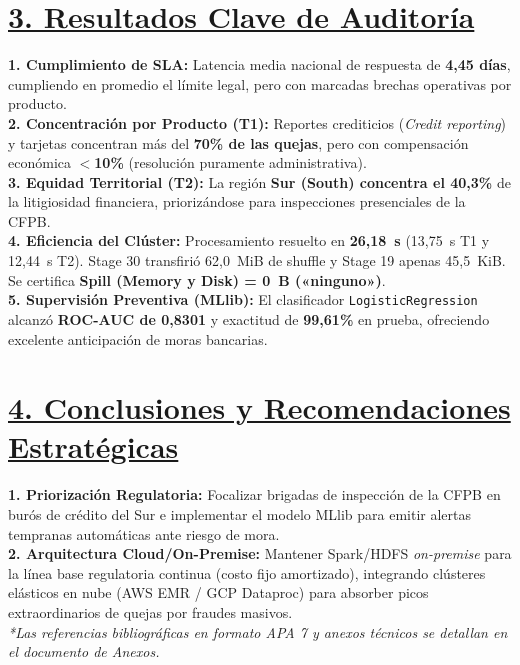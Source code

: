 \documentclass[12pt,letterpaper]{article}
\begin{document}
\section*{\underline{3. Resultados Clave de Auditoría}}
\textbf{1. Cumplimiento de SLA:} Latencia media nacional de respuesta de \textbf{4,45 días}, cumpliendo en promedio el límite legal, pero con marcadas brechas operativas por producto. \\
\textbf{2. Concentración por Producto (T1):} Reportes crediticios (\textit{Credit reporting}) y tarjetas concentran más del \textbf{70\% de las quejas}, pero con compensación económica \textbf{$<$10\%} (resolución puramente administrativa). \\
\textbf{3. Equidad Territorial (T2):} La región \textbf{Sur (South) concentra el 40,3\%} de la litigiosidad financiera, priorizándose para inspecciones presenciales de la CFPB. \\
\textbf{4. Eficiencia del Clúster:} Procesamiento resuelto en \textbf{26,18~s} (13,75~s T1 y 12,44~s T2). Stage 30 transfirió 62,0~MiB de shuffle y Stage 19 apenas 45,5~KiB. Se certifica \textbf{Spill (Memory y Disk) = 0~B («ninguno»)}. \\
\textbf{5. Supervisión Preventiva (MLlib):} El clasificador \texttt{LogisticRegression} alcanzó \textbf{ROC-AUC de 0,8301} y exactitud de \textbf{99,61\%} en prueba, ofreciendo excelente anticipación de moras bancarias.

\section*{\underline{4. Conclusiones y Recomendaciones Estratégicas}}
\textbf{1. Priorización Regulatoria:} Focalizar brigadas de inspección de la CFPB en burós de crédito del Sur e implementar el modelo MLlib para emitir alertas tempranas automáticas ante riesgo de mora. \\
\textbf{2. Arquitectura Cloud/On-Premise:} Mantener Spark/HDFS \textit{on-premise} para la línea base regulatoria continua (costo fijo amortizado), integrando clústeres elásticos en nube (AWS EMR / GCP Dataproc) para absorber picos extraordinarios de quejas por fraudes masivos. \\
\fontsize{8}{9}\selectfont\textit{*Las referencias bibliográficas en formato APA 7 y anexos técnicos se detallan en el documento de Anexos.}
\end{document}
